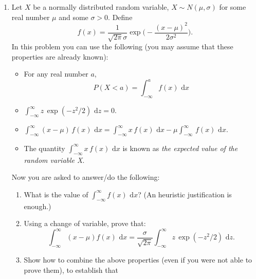 \documentclass[11pt,svgnames,spanish,oneside]{amsart}
\newenvironment{mysolution}{%
  \bigskip

  \solution\color{blue}Sol:
}{%
  \endsolution
}
\newcommand{\dd}{\, \text{d}}
\begin{document}
\begin{enumerate}[label=\textbf{P\arabic*.},itemsep=1em,leftmargin=*]
\begin{enumerate}
    \begin{mysolution}
    We want to find the probability $P(440 \le Y \le 610)$. First, we standardize the variables to the standard normal distribution $Z \sim N(0,1)$ using $Z = \frac{Y - \mu}{\sigma}$:
    $$ Z_1 = \frac{440 - 500}{50} = \frac{-60}{50} = -1.2 $$
    $$ Z_2 = \frac{610 - 500}{50} = \frac{110}{50} = 2.2 $$
    Thus, the probability is:
    $$ P(-1.2 \le Z \le 2.2) = \Phi(2.2) - \Phi(-1.2) $$
    Using standard normal distribution tables:
    $$ \Phi(2.2) \approx 0.9861, \quad \Phi(-1.2) \approx 0.1151 $$
    $$ P(-1.2 \le Z \le 2.2) = 0.9861 - 0.1151 = 0.8710 $$
    Therefore, approximately 87.10\% of the nanofiber population meets the optimal structural criteria.
    \end{mysolution}


      \bigskip
    \item Let $X$ be a normally distributed random variable, $X\sim N(\mu, \sigma)$ for some real number $\mu$ and some $\sigma>0$. Define
    $$ f(x) = \frac{1}{\sqrt{2\pi}\sigma }\exp \Bigg ( - \frac{(x-\mu)^2}{2\sigma^2}\Bigg ).$$
    In this problem you can use the following (you may assume that these properties are already known):
      \begin{itemize}
      \item For any real number $a$,
      $$
          P(X<a) = \int_{-\infty}^a f(x) \,\dd x
      $$
      \item $\displaystyle \int_{-\infty}^\infty z\, \exp(-z^2/2)\,\dd z =0. $
      \item $\displaystyle \int_{-\infty}^\infty (x-\mu)\, f(x)\,\dd x  = \int_{-\infty}^\infty x\, f(x)\,\dd x
          - \mu \int_{-\infty}^\infty\, f(x)\,\dd x.$
      \item The quantity $\displaystyle \int_{-\infty}^\infty x\, f(x)\,\dd x$ is known as \emph{the expected value of the random variable X}.
      \end{itemize}
    \medskip
    Now you are asked to answer/do the following:
    \begin{enumerate}
      \item What is the value of $\displaystyle \int_{-\infty}^{\infty} f(x) \,\dd x$? (An heuristic justification is enough.)
      \item Using a change of variable, prove that:
      $$
        \int_{-\infty}^{\infty} (x-\mu) f(x)\,\dd x = \frac{\sigma}{\sqrt{2\pi}} \int_{-\infty}^\infty z\, \exp(-z^2/2)\,\dd z.
      $$
      \item Show how to combine the above properties (even if you were not able to prove them), to establish that

\end{enumerate}
\end{enumerate}
\end{enumerate}
\end{document}
